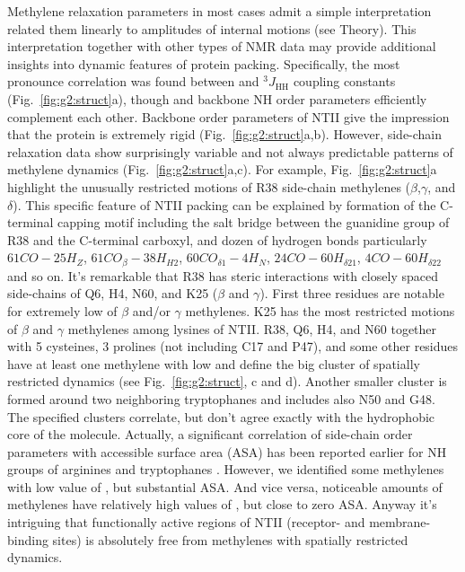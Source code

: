 \documentclass[twocolumn]{svjour3}           %
\begin{document}
Methylene relaxation parameters \gtwoCH{} in most cases admit a simple
interpretation related them linearly to amplitudes of internal motions
(see Theory). This interpretation together with other types of NMR data
may provide additional insights into dynamic features of protein packing.
Specifically, the most pro\-no\-unce correlation was found between
\gtwoCH{} and $^3J_\text{HH}$ coupling constants 
(Fig.~\ref{fig:g2:struct}a), though \gtwoCH{} and backbone NH order
parameters efficiently complement each other. Backbone order parameters 
of NTII give the impression that the protein is extremely rigid 
(Fig.~\ref{fig:g2:struct}a,b). However, side-chain relaxation 
data show surprisingly variable and not always predictable patterns 
of methylene dynamics (Fig.~\ref{fig:g2:struct}a,c). 
For example, Fig.~\ref{fig:g2:struct}a highlight the unusually 
restricted motions of R38 side-chain methylenes ($\beta$,$\gamma$, 
and $\delta$). This specific feature of NTII packing can be explained 
by formation of the C-terminal capping motif including the salt bridge between 
the guanidine group of R38 and the C-terminal carboxyl, and dozen of hydrogen bonds particularly $ 61CO-25H_Z $, $ 61CO_\beta-38H_{H2} $, $ 60CO_{\delta1}-4H_N $, $ 24CO-60H_{\delta21} $, $ 4CO-60H_{\delta22} $ and so on.
It's remarkable that R38 has steric interactions with closely spaced 
side-chains of Q6, H4, N60, and K25 ($\beta$ and $\gamma$). First three 
residues are notable for extremely low \gtwoCH{} of $\beta$ and/or 
$\gamma$ methylenes. K25 has the most restricted motions of $\beta$ and 
$\gamma$ methy\-lenes among lysines of NTII. R38, Q6, H4, and N60 together 
with 5 cysteines, 3 prolines (not including C17 and P47), and some 
other residues have at least one methylene with low \gtwoCH{} and 
define the big cluster of spatially restricted dynamics (see
Fig.~\ref{fig:g2:struct}, c and d). Another smaller cluster is formed 
around two neighboring tryptophanes and includes also N50 and G48. 
The specified clusters correlate, but don't agree exactly with the 
hydrophobic core of the molecule. Actually, a significant correlation 
of side-chain order parameters with accessible surface area (ASA) 
has been reported earlier for NH groups of arginines and tryptophanes
\cite{buck_structural_1995}. However, we identified some methylenes 
with low value of \gtwoCH{}, but substantial ASA. And vice versa, 
noticeable amounts of methylenes have relatively high values of 
\gtwoCH{}, but close to zero ASA. Anyway it's intriguing that 
functionally active regions of NTII (receptor- and membrane-binding 
sites) is absolutely free from methylenes with spatially restricted 
dynamics.
\end{document}
